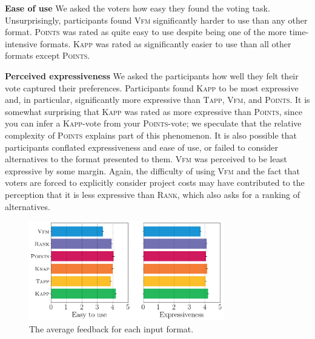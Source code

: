 \documentclass[letterpaper]{article} %
\newcommand{\points}{\textsc{Points}}
\newcommand{\rank}{\textsc{Rank}}
\newcommand{\vfm}{\textsc{Vfm}}
\newcommand{\kapp}{\textsc{Kapp}}
\newcommand{\tapp}{\textsc{Tapp}}
\begin{document}
\textbf{Ease of use}  We asked the voters how easy they found the voting task. Unsurprisingly, participants found \vfm{} significantly harder to use than any other format. \points{} was rated as quite easy to use despite being one of the more time-intensive formats. \kapp{} was rated as significantly easier to use than all other  formats except \points. 


\textbf{Perceived expressiveness} We asked the participants how well they felt their vote captured their preferences. 
Participants found \kapp{} to be most expressive and, in particular,  significantly more expressive than  \tapp, \vfm, and \points. It is somewhat surprising that \kapp{} was rated as more expressive than \points, since you can infer a \kapp-vote from  your \points-vote; we speculate that the relative complexity of  \points{} explains part of this phenomenon. It is also possible that participants conflated expressiveness and ease of use, or failed to consider alternatives to the format presented to them. %
\vfm{} was perceived to be least expressive by some margin. Again, the  difficulty of using \vfm{} and the fact that voters are forced to explicitly consider project costs may have contributed to the perception that it is less expressive than \rank, which also asks for a ranking of alternatives.  


\begin{figure}[!h]
\begin{center}
\includegraphics[width=8.5cm]{experiment/survey1.png}
\caption{The average feedback for each input format.
}\label{fig:feedback}
\end{center}\vspace{-3mm}
\end{figure}
\end{document}
